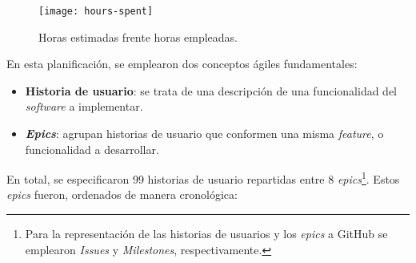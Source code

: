 \begin{figure}[h]
	\centering
	\texttt{[image: hours-spent]}
	\caption{Horas estimadas frente horas empleadas.}
\end{figure}

En esta planificación, se emplearon dos conceptos ágiles fundamentales:

\vspace{-0.3cm}
\begin{itemize}[\textbullet]
	\item \textbf{Historia de usuario}: se trata de una descripción de una funcionalidad del \emph{software} a implementar.
	\item \textbf{\emph{Epics}}: agrupan historias de usuario que conformen una misma \emph{feature}, o funcionalidad a desarrollar.
\end{itemize}

\vspace{-0.2cm}
En total, se especificaron 99 historias de usuario repartidas entre 8 \emph{epics}\footnote{Para la representación de las historias de usuarios y los \emph{epics} a GitHub se emplearon \emph{Issues} y \emph{Milestones}, respectivamente.}. Estos \emph{epics} fueron, ordenados de manera cronológica:

